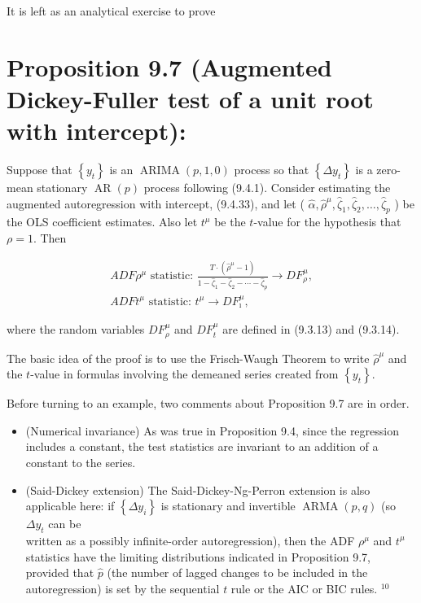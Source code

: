 \documentclass[10pt]{article}
\begin{document}
It is left as an analytical exercise to prove

\section*{Proposition 9.7 (Augmented Dickey-Fuller test of a unit root with intercept):}
Suppose that $\left\{y_{t}\right\}$ is an $\operatorname{ARIMA}(p, 1,0)$ process so that $\left\{\Delta y_{t}\right\}$ is a zero-mean stationary $\operatorname{AR}(p)$ process following (9.4.1). Consider estimating the augmented autoregression with intercept, (9.4.33), and let ( $\hat{\alpha}, \hat{\rho}^{\mu}, \hat{\zeta}_{1}, \hat{\zeta}_{2}, \ldots, \hat{\zeta}_{p}$ ) be the OLS coefficient estimates. Also let $t^{\mu}$ be the $t$-value for the hypothesis that $\rho=1$. Then


\begin{gather*}
A D F \rho^{\mu} \text { statistic: } \frac{T \cdot\left(\hat{\rho}^{\mu}-1\right)}{1-\hat{\zeta}_{1}-\hat{\zeta}_{2}-\cdots-\hat{\zeta}_{p}} \rightarrow D F_{\rho}^{\mu},  \tag{9.4.34}\\
A D F t^{\mu} \text { statistic: } t^{\mu} \rightarrow D F_{\imath}^{\mu}, \tag{9.4.35}
\end{gather*}


where the random variables $D F_{\rho}^{\mu}$ and $D F_{t}^{\mu}$ are defined in (9.3.13) and (9.3.14).

The basic idea of the proof is to use the Frisch-Waugh Theorem to write $\hat{\rho}^{\mu}$ and the $t$-value in formulas involving the demeaned series created from $\left\{y_{t}\right\}$.

Before turning to an example, two comments about Proposition 9.7 are in order.

\begin{itemize}
  \item (Numerical invariance) As was true in Proposition 9.4, since the regression includes a constant, the test statistics are invariant to an addition of a constant to the series.
  \item (Said-Dickey extension) The Said-Dickey-Ng-Perron extension is also applicable here: if $\left\{\Delta y_{i}\right\}$ is stationary and invertible $\operatorname{ARMA}(p, q)$ (so $\Delta y_{t}$ can be\\
written as a possibly infinite-order autoregression), then the ADF $\rho^{\mu}$ and $t^{\mu}$ statistics have the limiting distributions indicated in Proposition 9.7, provided that $\hat{p}$ (the number of lagged changes to be included in the autoregression) is set by the sequential $t$ rule or the AIC or BIC rules. ${ }^{10}$
\end{itemize}
\end{document}
